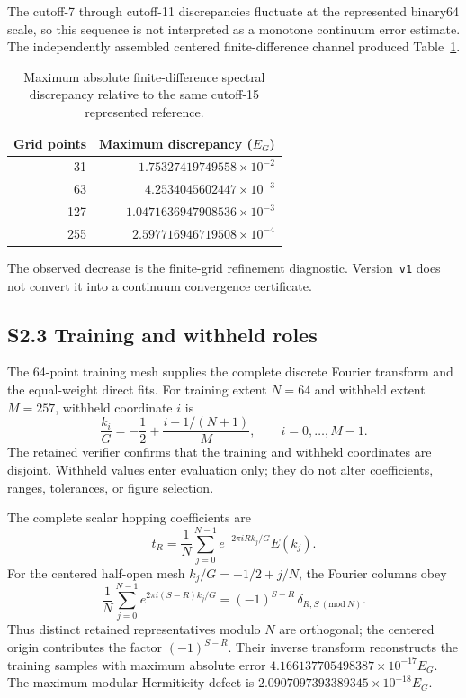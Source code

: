 The cutoff-7 through cutoff-11 discrepancies fluctuate at the represented
binary64 scale, so this sequence is not interpreted as a monotone continuum
error estimate. The independently assembled centered finite-difference channel
produced Table~\ref{tab:supp-m1-fd}.

\begin{table}[ht]
\centering
\caption{Maximum absolute finite-difference spectral discrepancy relative to
the same cutoff-15 represented reference.}
\label{tab:supp-m1-fd}
\begin{tabular}{@{}rr@{}}
\toprule
Grid points & Maximum discrepancy ($E_G$) \\
\midrule
31  & $1.75327419749558\times10^{-2}$ \\
63  & $4.2534045602447\times10^{-3}$ \\
127 & $1.0471636947908536\times10^{-3}$ \\
255 & $2.597716946719508\times10^{-4}$ \\
\bottomrule
\end{tabular}
\end{table}

The observed decrease is the finite-grid refinement diagnostic. Version~\texttt{v1}
does not convert it into a continuum convergence certificate.

\subsection*{S2.3 Training and withheld roles}

The 64-point training mesh supplies the complete discrete Fourier transform and
the equal-weight direct fits. For training extent $N=64$ and withheld extent
$M=257$, withheld coordinate $i$ is
\begin{equation}
 \frac{k_i}{G}=-\frac12+\frac{i+1/(N+1)}{M},
 \qquad i=0,\ldots,M-1.
 \label{eq:supp-m1-withheld}
\end{equation}
The retained verifier confirms that the training and withheld coordinates are
disjoint. Withheld values enter evaluation only; they do not alter coefficients,
ranges, tolerances, or figure selection.

The complete scalar hopping coefficients are
\begin{equation}
 t_R=\frac{1}{N}\sum_{j=0}^{N-1}
 e^{-2\pi iRk_j/G}E(k_j).
 \label{eq:supp-m1-transform}
\end{equation}
For the centered half-open mesh $k_j/G=-1/2+j/N$, the Fourier columns obey
\begin{equation}
 \frac{1}{N}\sum_{j=0}^{N-1}
 e^{2\pi i(S-R)k_j/G}
 =(-1)^{S-R}\,\delta_{R,S\ (\mathrm{mod}\ N)}.
 \label{eq:supp-m1-fourier-orthogonality}
\end{equation}
Thus distinct retained representatives modulo $N$ are orthogonal; the centered
origin contributes the factor $(-1)^{S-R}$. Their inverse transform reconstructs
the training samples with maximum absolute error
$4.166137705498387\times10^{-17}E_G$. The maximum modular Hermiticity defect is
$2.0907097393389345\times10^{-18}E_G$.

